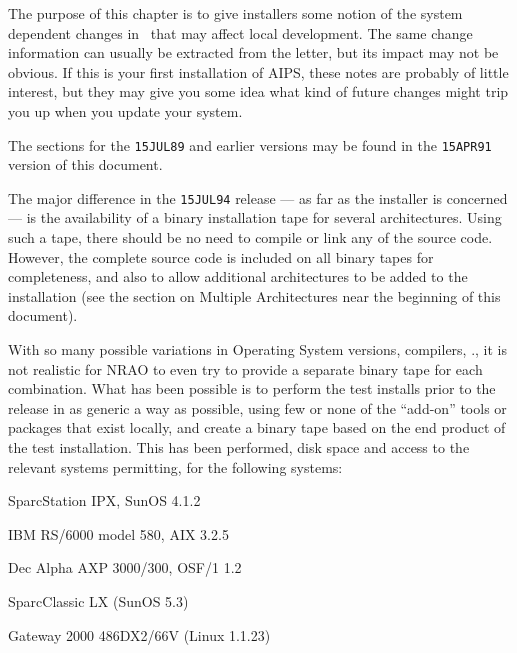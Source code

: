 \vfill\eject
{}


The purpose of this chapter is to give installers some notion of the
system dependent changes in \AIPS\ that may affect local development.
The same change information can usually be extracted from the
\AIPS letter, but its impact may not be obvious.  If this is your first
installation of AIPS, these notes are probably of little interest, but
they may give you some idea what kind of future changes might trip you
up when you update your system.

The sections for the {\tt 15JUL89} and earlier versions may be found
in the {\tt 15APR91} version of this document.

\medskip{}

\medskip{}

The major difference in the {\tt 15JUL94} release --- as far as the
installer is concerned --- is the availability of a binary installation
tape for several architectures.  Using such a tape, there should be no
need to compile or link any of the source code.  However, the complete
source code is included on all binary tapes for completeness, and also to
allow additional architectures to be added to the installation (see
the section on Multiple Architectures near the beginning of this
document).

With so many possible variations in Operating System versions, compilers,
\etc., it is not realistic for NRAO to even try to provide a separate
binary tape for each combination.  What has been possible is to perform
the test installs prior to the release in as generic a way as possible,
using few or none of the ``add-on'' tools or packages that exist locally,
and create a binary tape based on the end product of the test
installation.  This has been performed, disk space and access to the
relevant systems permitting, for the following systems:\medskip

\item{\bul} SparcStation IPX, SunOS 4.1.2
\item{\bul} IBM RS/6000 model 580, AIX 3.2.5
\item{\bul} Dec Alpha AXP 3000/300, OSF/1 1.2
\item{\bul} SparcClassic LX (SunOS 5.3)
\item{\bul} Gateway 2000 486DX2/66V (Linux 1.1.23)
\medskip

